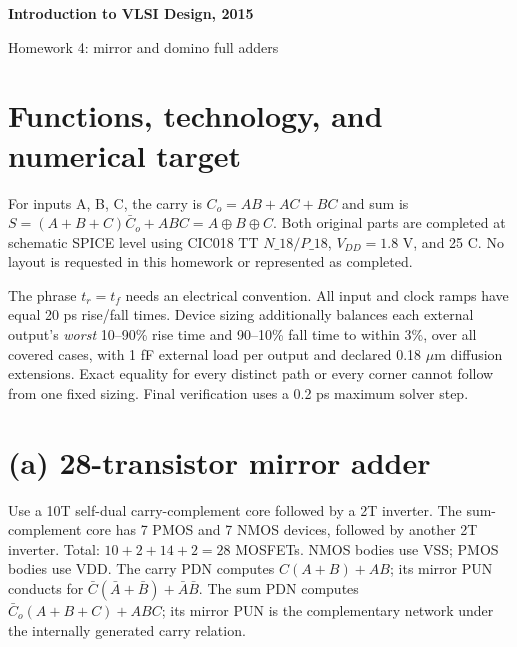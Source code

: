 \documentclass[11pt]{article}
\begin{document}
\begin{center}{\Large\bfseries Introduction to VLSI Design, 2015}\par{\large Homework 4: mirror and domino full adders}\end{center}
\section*{Functions, technology, and numerical target}
For inputs A, B, C, the carry is $C_o=AB+AC+BC$ and sum is $S=(A+B+C)\bar C_o+ABC=A\oplus B\oplus C$. Both original parts are completed at schematic SPICE level using CIC018 TT $N\_18/P\_18$, $V_{DD}=1.8$ V, and 25 C. No layout is requested in this homework or represented as completed.

The phrase $t_r=t_f$ needs an electrical convention. All input and clock ramps have equal 20 ps rise/fall times. Device sizing additionally balances each external output's \emph{worst} 10--90\% rise time and 90--10\% fall time to within 3\%, over all covered cases, with 1 fF external load per output and declared 0.18 $\mu$m diffusion extensions. Exact equality for every distinct path or every corner cannot follow from one fixed sizing. Final verification uses a 0.2 ps maximum solver step.

\section*{(a) 28-transistor mirror adder}
Use a 10T self-dual carry-complement core followed by a 2T inverter. The sum-complement core has 7 PMOS and 7 NMOS devices, followed by another 2T inverter. Total: $10+2+14+2=28$ MOSFETs. NMOS bodies use VSS; PMOS bodies use VDD. The carry PDN computes $C(A+B)+AB$; its mirror PUN conducts for $\bar C(\bar A+\bar B)+\bar A\bar B$. The sum PDN computes $\bar C_o(A+B+C)+ABC$; its mirror PUN is the complementary network under the internally generated carry relation.
\end{document}

